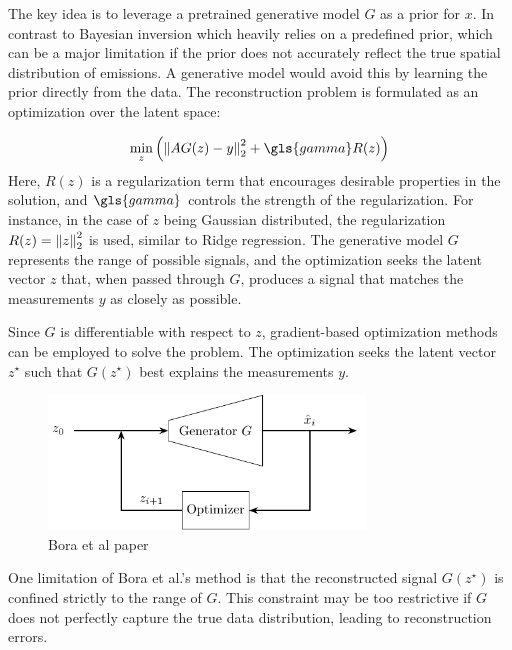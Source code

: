 The key idea is to leverage a pretrained generative model $G$ as a prior for $x$.
In contrast to Bayesian inversion which heavily relies on a predefined prior, which can be a major limitation if the prior does not accurately reflect the true spatial distribution of emissions.
A generative model would avoid this by learning the prior directly from the data.
The reconstruction problem is formulated as an optimization over the latent space:

\begin{equation}
    \min_{z}{\left( \norm{A G(z) - y}_2^2 + \gls{gamma} R(z) \right)}
\end{equation}
Here, $R(z)$ is a regularization term that encourages desirable properties in the solution, and $\gls{gamma}$ controls the strength of the regularization.
For instance, in the case of $z$ being Gaussian distributed, the regularization $R(z) = \left\lVert z\right\rVert_2^2$ is used, similar to Ridge regression.
The generative model $G$ represents the range of possible signals, and the optimization seeks the latent vector $z$ that, when passed through $G$, produces a signal that matches the measurements $y$ as closely as possible.

Since $G$ is differentiable with respect to $z$, gradient-based optimization methods can be employed to solve the problem.
The optimization seeks the latent vector $z^{\star}$ such that $G(z^{\star})$ best explains the measurements $y$.

\begin{figure}[h!]
    \centering
    \includegraphics[width=0.75\textwidth]{figures/02_related_work/latent_variable_optimization/build/latent_variable_optimization.pdf}
    \caption{Bora et al paper}
    \label{fig:gen_solver}
\end{figure}

One limitation of Bora et al.'s method is that the reconstructed signal $G(z^{\star})$ is confined strictly to the range of $G$.
This constraint may be too restrictive if $G$ does not perfectly capture the true data distribution, leading to reconstruction errors.

